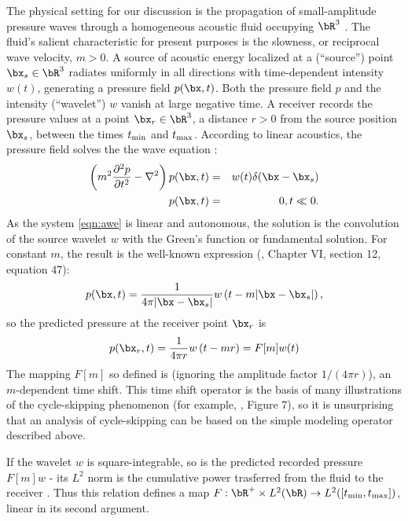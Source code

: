 The physical setting for our discussion is the propagation of
small-amplitude pressure waves through a
homogeneous acoustic fluid occupying $\bR^3$ \cite[]{Frie:58}. The
fluid's salient characteristic for present purposes is the
slowness, or reciprocal wave velocity, $m > 0$. A source of acoustic
energy localized at a (``source'') point $\bx_s \in \bR^3$ radiates uniformly in all
directions with time-dependent intensity $w(t)$, generating a pressure
field $p(\bx,t)$. Both the 
pressure field $p$ and the intensity (``wavelet'') $w$ vanish at large
negative time. A receiver records the pressure values at a point
$\bx_r \in \bR^3$, a distance
$r>0$ from the source position $\bx_s$, between the times $t_{\rm min}$ and
$t_{\rm max}$. According to linear acoustics, the pressure field
solves the the wave equation \cite[]{Frie:58}:
\begin{eqnarray}
  \label{eqn:awe}
  \left(m^2\frac{\partial^2 p}{\partial t^2} - \nabla^2\right) p(\bx,t) &=&
                                                                         w(t)\delta(\bx-\bx_s) \nonumber\\
  p(\bx,t)&=&0, t\ll 0.
\end{eqnarray}
As the system \ref{eqn:awe} is linear and autonomous, the solution is
the convolution of the source
wavelet $w$ with the Green's function or fundamental solution. For
constant $m$, the result is the well-known expression
(\cite{CourHil:62}, Chapter VI, section 12, equation 47):
\begin{equation}
  \label{eqn:homsol}
  p(\bx,t) = \frac{1}{4\pi |\bx-\bx_s|}w\left(t-m|\bx-\bx_s|\right),
\end{equation}
so the predicted pressure at the receiver point $\bx_r$ is
\begin{equation}
\label{eqn:mod}
p(\bx_r,t) = \frac{1}{4\pi r}w\left(t-mr\right)  = F[m]w(t)
\end{equation}
The mapping $F[m]$ so defined is (ignoring the amplitude factor
$1/(4\pi r)$), an $m$-dependent time shift. This time shift operator is the basis of many illustrations of
the cycle-skipping phenomenon (for example, \cite{VirieuxOperto:09},
Figure 7), so it is unsurprising that an analysis of cycle-skipping
can be based on the simple modeling operator described above.

If the wavelet $w$ is square-integrable, so is the predicted
recorded pressure $F[m]w$ - its $L^2$ norm is the cumulative power trasferred
from the fluid to the receiver \cite[]{SantosaSymes:00}. Thus this relation defines a map
$F: \bR^+ \times L^2(\bR) \rightarrow
L^2([t_{\rm min},t_{\rm max}])$, linear in its second argument.

